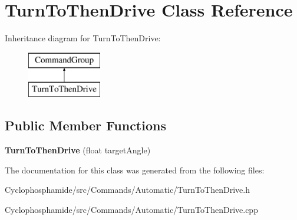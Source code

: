 \hypertarget{class_turn_to_then_drive}{}\section{Turn\+To\+Then\+Drive Class Reference}
\label{class_turn_to_then_drive}
Inheritance diagram for Turn\+To\+Then\+Drive\+:\begin{figure}[H]
\begin{center}
\leavevmode
\includegraphics[height=2.000000cm]{class_turn_to_then_drive}
\end{center}
\end{figure}
\subsection*{Public Member Functions}
\begin{DoxyCompactItemize}
\item 
\hypertarget{class_turn_to_then_drive_a827a2f68850522352a7ce5b21c37f76b}{}{\bfseries Turn\+To\+Then\+Drive} (float target\+Angle)\label{class_turn_to_then_drive_a827a2f68850522352a7ce5b21c37f76b}

\end{DoxyCompactItemize}


The documentation for this class was generated from the following files\+:\begin{DoxyCompactItemize}
\item 
Cyclophosphamide/src/\+Commands/\+Automatic/Turn\+To\+Then\+Drive.\+h\item 
Cyclophosphamide/src/\+Commands/\+Automatic/Turn\+To\+Then\+Drive.\+cpp\end{DoxyCompactItemize}
